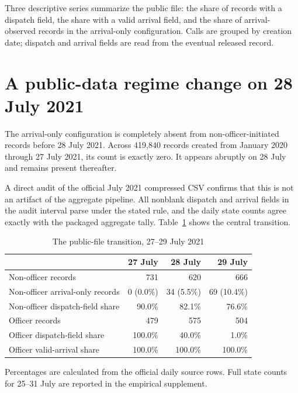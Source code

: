 \documentclass[11pt]{article}
\begin{document}
Three descriptive series summarize the public file: the share of records with a dispatch field, the share with a valid arrival field, and the share of arrival-observed records in the arrival-only configuration. Calls are grouped by creation date; dispatch and arrival fields are read from the eventual released record.

\section{A public-data regime change on 28 July 2021}

The arrival-only configuration is completely absent from non-officer-initiated records before 28 July 2021. Across 419,840 records created from January 2020 through 27 July 2021, its count is exactly zero. It appears abruptly on 28 July and remains present thereafter.

A direct audit of the official July 2021 compressed CSV confirms that this is not an artifact of the aggregate pipeline. All nonblank dispatch and arrival fields in the audit interval parse under the stated rule, and the daily state counts agree exactly with the packaged aggregate tally. Table~\ref{tab:julybreak} shows the central transition.

\begin{table}[t]
\centering
\caption{The public-file transition, 27--29 July 2021}
\label{tab:julybreak}
\begin{tabular}{@{}lrrr@{}}
\toprule
 & 27 July & 28 July & 29 July \\
\midrule
Non-officer records & 731 & 620 & 666 \\
Non-officer arrival-only records & 0 (0.0\%) & 34 (5.5\%) & 69 (10.4\%) \\
Non-officer dispatch-field share & 90.0\% & 82.1\% & 76.6\% \\
Officer records & 479 & 575 & 504 \\
Officer dispatch-field share & 100.0\% & 40.0\% & 1.0\% \\
Officer valid-arrival share & 100.0\% & 100.0\% & 100.0\% \\
\bottomrule
\end{tabular}
\begin{minipage}{0.96\textwidth}\footnotesize
Percentages are calculated from the official daily source rows. Full state counts for 25--31 July are reported in the empirical supplement.
\end{minipage}
\end{table}
\end{document}
